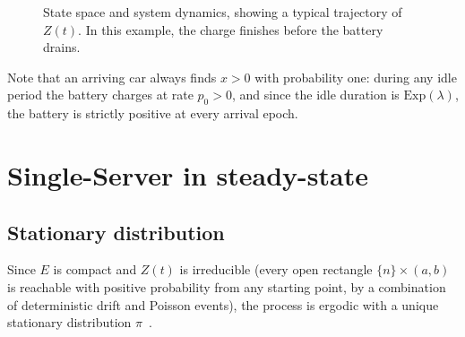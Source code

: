 \documentclass{sig-alternate-per-modified}
\begin{document}
\begin{figure}
  \begin{center}
  \end{center}
  \caption{State space and system dynamics, showing a typical trajectory of $Z(t)$. In this example, the charge finishes before the battery drains.}\label{fig:dynamics_single_server}
\end{figure}

Note that an arriving car always finds $x>0$ with probability one: during any idle
period the battery charges at rate $p_0>0$, and since the idle duration is
$\mathrm{Exp}(\lambda)$, the battery is strictly positive at every
arrival epoch.

\section{Single-Server in steady-state}
\label{sec:stationary}

\subsection{Stationary distribution}\label{ssec:stationary_dist}

Since $E$ is compact and $Z(t)$ is irreducible (every open rectangle
$\{n\}\times(a,b)$ is reachable with positive probability from any starting point, by
a combination of deterministic drift and Poisson events), the process is ergodic with a
unique stationary distribution $\pi$~\cite{MeynTweedie1993}.
\end{document}
